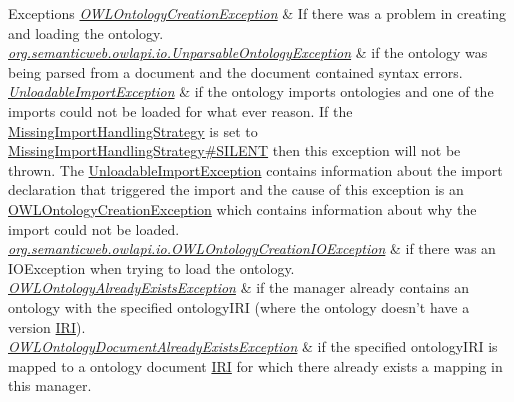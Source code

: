 \begin{DoxyExceptions}{Exceptions}
{\em \hyperlink{classorg_1_1semanticweb_1_1owlapi_1_1model_1_1_o_w_l_ontology_creation_exception}{O\-W\-L\-Ontology\-Creation\-Exception}} & If there was a problem in creating and loading the ontology. \\
\hline
{\em \hyperlink{classorg_1_1semanticweb_1_1owlapi_1_1io_1_1_unparsable_ontology_exception}{org.\-semanticweb.\-owlapi.\-io.\-Unparsable\-Ontology\-Exception}} & if the ontology was being parsed from a document and the document contained syntax errors. \\
\hline
{\em \hyperlink{classorg_1_1semanticweb_1_1owlapi_1_1model_1_1_unloadable_import_exception}{Unloadable\-Import\-Exception}} & if the ontology imports ontologies and one of the imports could not be loaded for what ever reason. If the \hyperlink{enumorg_1_1semanticweb_1_1owlapi_1_1model_1_1_missing_import_handling_strategy}{Missing\-Import\-Handling\-Strategy} is set to \hyperlink{enumorg_1_1semanticweb_1_1owlapi_1_1model_1_1_missing_import_handling_strategy_aed66060ec95dc4ad59ca4dd82509782b}{Missing\-Import\-Handling\-Strategy\#\-S\-I\-L\-E\-N\-T} then this exception will not be thrown. The {\ttfamily \hyperlink{classorg_1_1semanticweb_1_1owlapi_1_1model_1_1_unloadable_import_exception}{Unloadable\-Import\-Exception}} contains information about the import declaration that triggered the import and the cause of this exception is an {\ttfamily \hyperlink{classorg_1_1semanticweb_1_1owlapi_1_1model_1_1_o_w_l_ontology_creation_exception}{O\-W\-L\-Ontology\-Creation\-Exception}} which contains information about why the import could not be loaded. \\
\hline
{\em \hyperlink{classorg_1_1semanticweb_1_1owlapi_1_1io_1_1_o_w_l_ontology_creation_i_o_exception}{org.\-semanticweb.\-owlapi.\-io.\-O\-W\-L\-Ontology\-Creation\-I\-O\-Exception}} & if there was an {\ttfamily I\-O\-Exception} when trying to load the ontology. \\
\hline
{\em \hyperlink{classorg_1_1semanticweb_1_1owlapi_1_1model_1_1_o_w_l_ontology_already_exists_exception}{O\-W\-L\-Ontology\-Already\-Exists\-Exception}} & if the manager already contains an ontology with the specified {\ttfamily ontology\-I\-R\-I} (where the ontology doesn't have a version \hyperlink{classorg_1_1semanticweb_1_1owlapi_1_1model_1_1_i_r_i}{I\-R\-I}). \\
\hline
{\em \hyperlink{classorg_1_1semanticweb_1_1owlapi_1_1model_1_1_o_w_l_ontology_document_already_exists_exception}{O\-W\-L\-Ontology\-Document\-Already\-Exists\-Exception}} & if the specified {\ttfamily ontology\-I\-R\-I} is mapped to a ontology document \hyperlink{classorg_1_1semanticweb_1_1owlapi_1_1model_1_1_i_r_i}{I\-R\-I} for which there already exists a mapping in this manager. \\
\hline
\end{DoxyExceptions}


